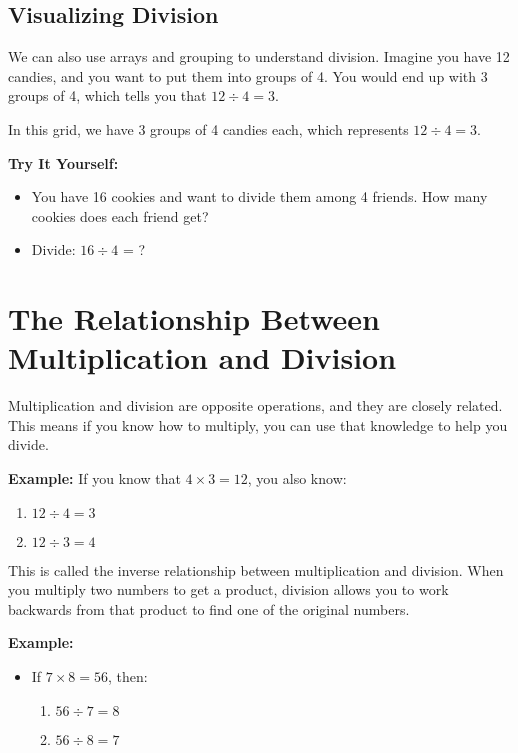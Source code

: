 \subsection{Visualizing Division}
We can also use arrays and grouping to understand division. Imagine you have 12 candies, and you want to put them into groups of 4. You would end up with 3 groups of 4, which tells you that $12 \div 4 = 3$.
\begin{center}
\end{center}

In this grid, we have 3 groups of 4 candies each, which represents $12 \div 4 = 3$.

\textbf{Try It Yourself:}
\begin{itemize}
    \item You have 16 cookies and want to divide them among 4 friends. How many cookies does each friend get?
    \item Divide: $16 \div 4$ = ?
\end{itemize}

\section{The Relationship Between Multiplication and Division}
Multiplication and division are opposite operations, and they are closely related. This means if you know how to multiply, you can use that knowledge to help you divide.

\textbf{Example:} If you know that $4 \times 3 = 12$, you also know:
\begin{enumerate}[label=(\alph*)]
    \item $12 \div 4 = 3$
    \item $12 \div 3 = 4$
\end{enumerate}

This is called the inverse relationship between multiplication and division. When you multiply two numbers to get a product, division allows you to work backwards from that product to find one of the original numbers.

\textbf{Example:}
\begin{itemize}
    \item If $7 \times 8 = 56$, then:
    \begin{enumerate}[label=(\alph*)]
        \item $56 \div 7 = 8$
        \item $56 \div 8 = 7$
    \end{enumerate}
\end{itemize}

